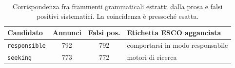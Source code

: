 \begin{table}[htbp]
  \centering
  \caption{Corrispondenza fra frammenti grammaticali estratti dalla prosa e
           falsi positivi sistematici. La coincidenza è pressoché esatta.}
  \label{tab:detriti}
  \begin{tabular}{lccl}
    \toprule
    \textbf{Candidato} & \textbf{Annunci} & \textbf{Falsi pos.} & \textbf{Etichetta ESCO agganciata} \\
    \midrule
    \texttt{responsible} & 792 & 792 & comportarsi in modo responsabile \\
    \texttt{seeking}     & 773 & 772 & motori di ricerca \\
    \bottomrule
  \end{tabular}
\end{table}
